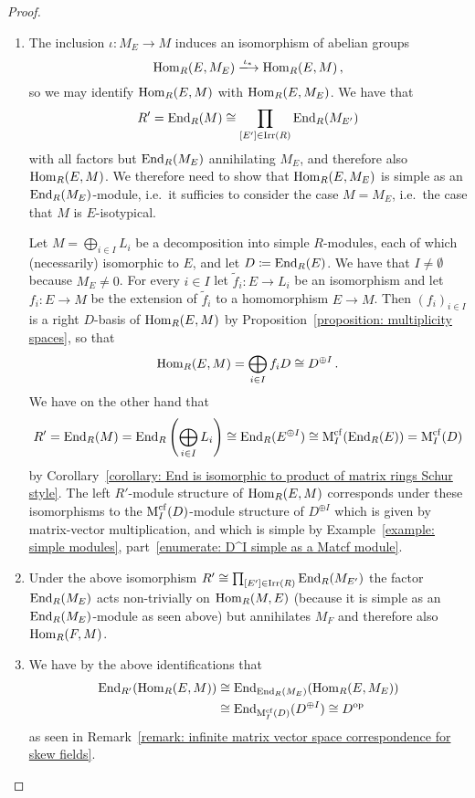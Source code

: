 \begin{proof}
  \leavevmode
  \begin{enumerate}
    \item
      The inclusion $\iota \colon M_E \to M$ induces an isomorphism of abelian groups
      \[
        \Hom_R(E, M_E)
        \xlongrightarrow{\iota_*}
        \Hom_R(E, M) \,,
      \]
      so we may identify $\operatorname{Hom}_R(E, M)$ with $\operatorname{Hom}_R(E, M_E)$.
      We have that
      \[
              R'
        =     \operatorname{End}_R(M)
        \cong \prod_{[E'] \in \operatorname{Irr}(R)} \operatorname{End}_R(M_{E'})
      \]
      with all factors but $\operatorname{End}_R(M_E)$ annihilating $M_E$, and therefore also $\operatorname{Hom}_R(E,M)$.
      We therefore need to show that $\operatorname{Hom}_R(E,M_E)$ is simple as an $\operatorname{End}_R(M_E)$-module, i.e.\ it sufficies to consider the case $M = M_E$, i.e.\ the case that $M$ is $E$-isotypical.
      
      Let $M = \bigoplus_{i \in I} L_i$ be a decomposition into simple $R$-modules, each of which (necessarily) isomorphic to $E$, and let $D \coloneqq \operatorname{End}_R(E)$.
      We have that $I \neq \emptyset$ because $M_E \neq 0$.
      For every $i \in I$ let $\tilde{f}_i \colon E \to L_i$ be an isomorphism and let $f_i \colon E \to M$ be the extension of $\tilde{f}_i$ to a homomorphism $E \to M$.
      Then $(f_i)_{i \in I}$ is a right $D$-basis of $\operatorname{Hom}_R(E,M)$ by Proposition~\ref{proposition: multiplicity spaces}, so that
      \[
              \operatorname{Hom}_R(E,M)
        =     \bigoplus_{i \in I} f_i D
        \cong D^{\oplus I} \,.
      \]
      We have on the other hand that
      \[
              R'
        =     \operatorname{End}_R(M)
        =     \operatorname{End}_R\left( \bigoplus_{i \in I} L_i \right)
        \cong \operatorname{End}_R( E^{\oplus I} )
        \cong \operatorname{M}_I^{{\operatorname{cf}}}( \operatorname{End}_R(E) )
        =     \operatorname{M}_I^{{\operatorname{cf}}}( D )
      \]
      by Corollary~\ref{corollary: End is isomorphic to product of matrix rings Schur style}.
      The left $R'$-module structure of $\operatorname{Hom}_R(E,M)$ corresponds under these isomorphisms to the $\operatorname{M}_I^{{\operatorname{cf}}}(D)$-module structure of $D^{\oplus I}$ which is given by matrix-vector multiplication, and which is simple by Example~\ref{example: simple modules}, part~\ref*{enumerate: D^I simple as a Matcf module}.
    \item
      Under the above isomorphism $R' \cong \prod_{[E'] \in \operatorname{Irr}(R)} \operatorname{End}_R(M_{E'})$ the factor $\operatorname{End}_R(M_E)$ acts non-trivially on $\operatorname{Hom}_R(M,E)$ (because it is simple as an $\operatorname{End}_R(M_E)$-module as seen above) but annihilates $M_F$ and therefore also $\operatorname{Hom}_R(F,M)$.
    \item
      We have by the above identifications that 
      \begin{align*}
                \operatorname{End}_{R'}( \operatorname{Hom}_R(E,M) )
        &\cong  \operatorname{End}_{\operatorname{End}_R(M_E)}( \operatorname{Hom}_{R}(E,M_E) )   \\
        &\cong  \operatorname{End}_{\operatorname{M}_I^{{\operatorname{cf}}}(D)}( D^{\oplus I} )
         \cong  D^{\operatorname{op}}
      \end{align*}
      as seen in Remark~\ref{remark: infinite matrix vector space correspondence for skew fields}.
    \qedhere
  \end{enumerate}
\end{proof}



